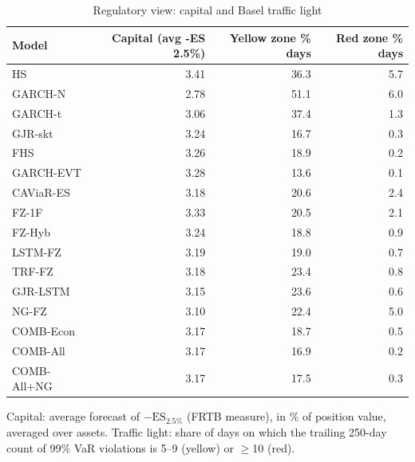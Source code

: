 \begin{table}[htbp]
\centering
\footnotesize
\caption{Regulatory view: capital and Basel traffic light}
\label{tab:reg}
\begin{tabular}{lrrr}
\toprule
Model & Capital (avg -ES 2.5\%) & Yellow zone \% days & Red zone \% days \\
\midrule
HS & 3.41 & 36.3 & 5.7 \\
GARCH-N & 2.78 & 51.1 & 6.0 \\
GARCH-t & 3.06 & 37.4 & 1.3 \\
GJR-skt & 3.24 & 16.7 & 0.3 \\
FHS & 3.26 & 18.9 & 0.2 \\
GARCH-EVT & 3.28 & 13.6 & 0.1 \\
CAViaR-ES & 3.18 & 20.6 & 2.4 \\
FZ-1F & 3.33 & 20.5 & 2.1 \\
FZ-Hyb & 3.24 & 18.8 & 0.9 \\
LSTM-FZ & 3.19 & 19.0 & 0.7 \\
TRF-FZ & 3.18 & 23.4 & 0.8 \\
GJR-LSTM & 3.15 & 23.6 & 0.6 \\
NG-FZ & 3.10 & 22.4 & 5.0 \\
COMB-Econ & 3.17 & 18.7 & 0.5 \\
COMB-All & 3.17 & 16.9 & 0.2 \\
COMB-All+NG & 3.17 & 17.5 & 0.3 \\
\bottomrule
\end{tabular}
\par\smallskip\parbox{\linewidth}{\scriptsize Capital: average forecast of $-\mathrm{ES}_{2.5\%}$ (FRTB measure), in \% of position value, averaged over assets. Traffic light: share of days on which the trailing 250-day count of 99\% VaR violations is 5--9 (yellow) or $\geq$10 (red).}
\end{table}